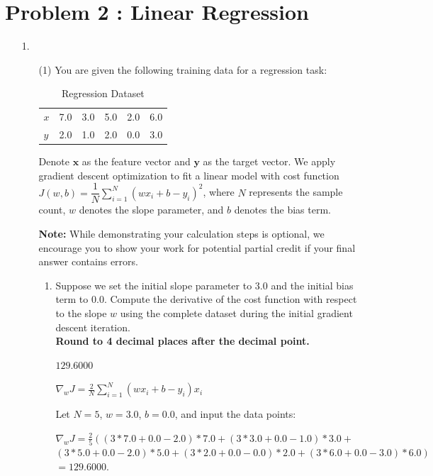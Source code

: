 \documentclass[11pt,addpoints,answers]{exam}
\newcounter{subq}        %
\renewcommand{\thesubq}{(\alph{subq})}  %
\newenvironment{subquestions}{
	\setcounter{subq}{0}%
	\begin{enumerate}[
		label=\thesubq,
		leftmargin=*,
		align=left,
		itemsep=6pt
		]
	}{
	\end{enumerate}
}
\newcommand{\subquestion}{\refstepcounter{subq}\item}  %
\begin{document}
	\section*{Problem 2 : Linear Regression}
	
	\begin{enumerate}
		\item[1.] 
		\begin{enumerate}[label=\alph*), itemsep=10pt]
			\item[(1)] You are given the following training data for a regression task:
			\begin{table}[H]
				\centering
				\begin{tabular}{llllll}
					$x$ & 7.0 & 3.0 & 5.0 & 2.0 & 6.0 \\
					$y$ & 2.0 & 1.0 & 2.0 & 0.0 & 3.0
				\end{tabular}
				\caption{Regression Dataset} \label{tab:reg7_data}  %
			\end{table}
			Denote $\bm{x}$ as the feature vector and $\bm{y}$ as the target vector. We apply gradient descent optimization to fit a linear model with cost function $J(w, b) = \dfrac{1}{N}\sum\limits_{i=1}^N (wx_i + b - y_i)^2$, where $N$ represents the sample count, $w$ denotes the slope parameter, and $b$ denotes the bias term.
			
			\textbf{Note:} While demonstrating your calculation steps is optional, we encourage you to show your work for potential partial credit if your final answer contains errors.
			
			\begin{subquestions}
				\subquestion Suppose we set the initial slope parameter to $3.0$ and the initial bias term to $0.0$. Compute the derivative of the cost function with respect to the slope $w$ using the complete dataset during the initial gradient descent iteration. 
				\\ \textbf{Round to 4 decimal places after the decimal point.}
				
				\begin{answer_box}[title=Gradient:,height=2cm,width=6cm]
					$129.6000$
				\end{answer_box}
				
				\begin{answer_box}[title=Work,height=6cm]
					$\nabla_w J = \frac2N\sum_{i=1}^N (wx_i + b - y_i)x_i$

					Let $N=5$, $w=3.0$, $b=0.0$, and input the data points:

					$\nabla_w J = \frac25\left((3*7.0 + 0.0 - 2.0)*7.0 + (3*3.0 + 0.0 - 1.0)*3.0 + \right.$\\
					$\left.(3*5.0 + 0.0 - 2.0)*5.0 + (3*2.0 + 0.0 - 0.0)*2.0 + (3*6.0 + 0.0 - 3.0)*6.0\right)$\\
					$= 129.6000.$


\end{answer_box}
\end{subquestions}
\end{enumerate}
\end{enumerate}
\end{document}
